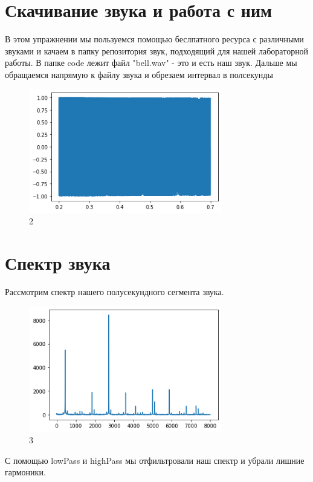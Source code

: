 \documentclass{article}
\begin{document}
\section{Скачивание звука и работа с ним}
В этом упражнении мы пользуемся помощью беслпатного ресурса с различными звуками и качаем в папку репозитория звук, подходящий для нашей лабораторной работы. В папке code лежит файл "bell.wav" - это и есть наш звук.  Дальше мы обращаемся напрямую к файлу звука и обрезаем интервал в полсекунды
\begin{figure}[H]
        \centering
        \includegraphics[width=0.75\textwidth]{pic/1.png}
        \caption{2}
        \label{fig:first}
\end{figure}

\section{Спектр звука}

Рассмотрим спектр нашего полусекундного сегмента звука.
\begin{figure}[H]
        \centering
        \includegraphics[width=0.75\textwidth]{pic/2.png}
        \caption{3}
        \label{fig:second}
\end{figure}

С помощью lowPass и highPass мы отфильтровали наш спектр и убрали лишние гармоники. 
\end{document}
